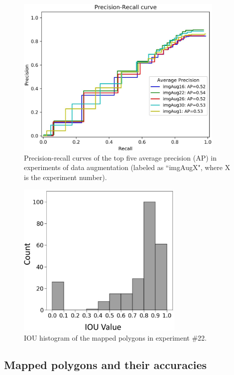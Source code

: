 \documentclass[authoryear,preprint,review,12pt]{elsarticle}
\begin{document}
\begin{figure}
	\centering
	\includegraphics[width=10cm]{figures/top5_curves_trim.jpg}
	\caption{Precision-recall curves of the top five average precision (AP) in experiments of data augmentation (labeled as ``imgAugX", where X is the experiment number).}
	\label{fig_ap_top5}
\end{figure}

\begin{figure}
	\centering
	\includegraphics[width=8cm]{figures/IoU_imgAug22_label_trim.jpg}
	\caption{IOU histogram of the mapped polygons in experiment \#22.}
	\label{fig_iou_hist_exp16}
\end{figure}

\subsection{Mapped polygons and their accuracies}
\label{subsec_mapped_accuracies}
\end{document}

